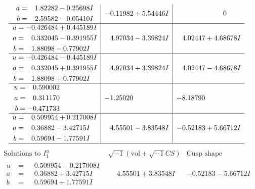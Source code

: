 \documentclass[1p]{elsarticle_modified}
\theoremstyle{definition}
\newcommand{\I}{\sqrt{-1}}
\begin{document}
$$\begin{array}{c|c|c}
\begin{aligned}
a &= \phantom{-}1.82282 - 0.25698 I \\
b &= \phantom{-}2.59582 - 0.05410 I\end{aligned}
 & -0.11982 + 5.54446 I & \phantom{-0.000000 } 0 \\ \hline\begin{aligned}
u &= -0.426484 + 0.445189 I \\
a &= \phantom{-}0.332045 - 0.391955 I \\
b &= \phantom{-}1.88098 - 0.77902 I\end{aligned}
 & \phantom{-}4.97034 - 3.39824 I & \phantom{-}4.02447 + 4.68678 I \\ \hline\begin{aligned}
u &= -0.426484 - 0.445189 I \\
a &= \phantom{-}0.332045 + 0.391955 I \\
b &= \phantom{-}1.88098 + 0.77902 I\end{aligned}
 & \phantom{-}4.97034 + 3.39824 I & \phantom{-}4.02447 - 4.68678 I \\ \hline\begin{aligned}
u &= \phantom{-}0.590002\phantom{ +0.000000I} \\
a &= \phantom{-}0.311170\phantom{ +0.000000I} \\
b &= -0.471733\phantom{ +0.000000I}\end{aligned}
 & -1.25020\phantom{ +0.000000I} & -8.18790\phantom{ +0.000000I} \\ \hline\begin{aligned}
u &= \phantom{-}0.509954 + 0.217008 I \\
a &= \phantom{-}0.36882 - 3.42715 I \\
b &= \phantom{-}0.59694 - 1.77591 I\end{aligned}
 & \phantom{-}4.55501 - 3.83548 I & -0.52183 + 5.66712 I\\
 \hline 
 \end{array}$$\newpage$$\begin{array}{c|c|c}  
\text{Solutions to }I^u_{1}& \I (\text{vol} + \sqrt{-1}CS) & \text{Cusp shape}\\
 \hline 
\begin{aligned}
u &= \phantom{-}0.509954 - 0.217008 I \\
a &= \phantom{-}0.36882 + 3.42715 I \\
b &= \phantom{-}0.59694 + 1.77591 I\end{aligned}
 & \phantom{-}4.55501 + 3.83548 I & -0.52183 - 5.66712 I \\ \hline\begin{aligned}

\end{aligned}
\end{array}$$
\end{document}
